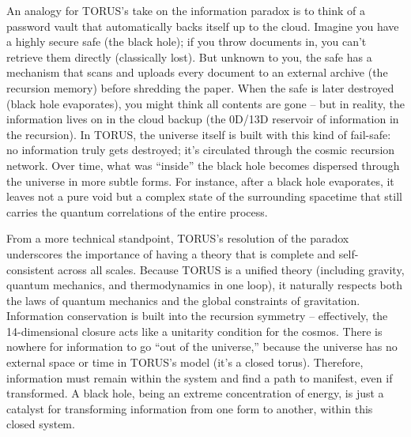 \documentclass[]{article}
\begin{document}
An analogy for TORUS's take on the information paradox is to think of a
password vault that automatically backs itself up to the cloud. Imagine
you have a highly secure safe (the black hole); if you throw documents
in, you can't retrieve them directly (classically lost). But unknown to
you, the safe has a mechanism that scans and uploads every document to
an external archive (the recursion memory) before shredding the paper.
When the safe is later destroyed (black hole evaporates), you might
think all contents are gone -- but in reality, the information lives on
in the cloud backup (the 0D/13D reservoir of information in the
recursion). In TORUS, the universe itself is built with this kind of
fail-safe: no information truly gets destroyed; it's circulated through
the cosmic recursion network. Over time, what was ``inside'' the black
hole becomes dispersed through the universe in more subtle forms. For
instance, after a black hole evaporates, it leaves not a pure void but a
complex state of the surrounding spacetime that still carries the
quantum correlations of the entire process.

From a more technical standpoint, TORUS's resolution of the paradox
underscores the importance of having a theory that is complete and
self-consistent across all scales. Because TORUS is a unified theory
(including gravity, quantum mechanics, and thermodynamics in one loop),
it naturally respects both the laws of quantum mechanics and the global
constraints of gravitation. Information conservation is built into the
recursion symmetry -- effectively, the 14-dimensional closure acts like
a unitarity condition for the cosmos. There is nowhere for information
to go ``out of the universe,'' because the universe has no external
space or time in TORUS's model (it's a closed torus). Therefore,
information must remain within the system and find a path to manifest,
even if transformed. A black hole, being an extreme concentration of
energy, is just a catalyst for transforming information from one form to
another, within this closed system.
\end{document}
